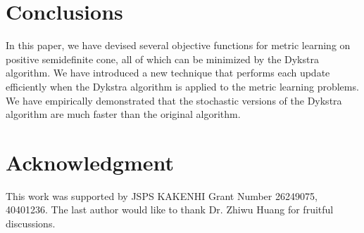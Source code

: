 \documentclass[10pt,onecolumn]{article}
\theoremstyle{definition}
\theoremstyle{definition}
\theoremstyle{definition}
\theoremstyle{definition}
\theoremstyle{definition}
\theoremstyle{theorem}
\newcommand{\0}{{\bm{0}}}
\newcommand{\1}{{\bm{1}}}
\begin{document}
\section{Conclusions}
In this paper, we have devised several objective functions
for metric learning on positive semidefinite cone, all of
which can be minimized by the Dykstra algorithm. We have
introduced a new technique that performs each update
efficiently when the Dykstra algorithm is applied to the
metric learning problems. We have empirically demonstrated
that the stochastic versions of the Dykstra algorithm are
much faster than the original algorithm.


\section*{Acknowledgment}
This work was supported by JSPS KAKENHI Grant Number
26249075, 40401236.
The last author would like to thank Dr. Zhiwu Huang for fruitful discussions.
\end{document}
